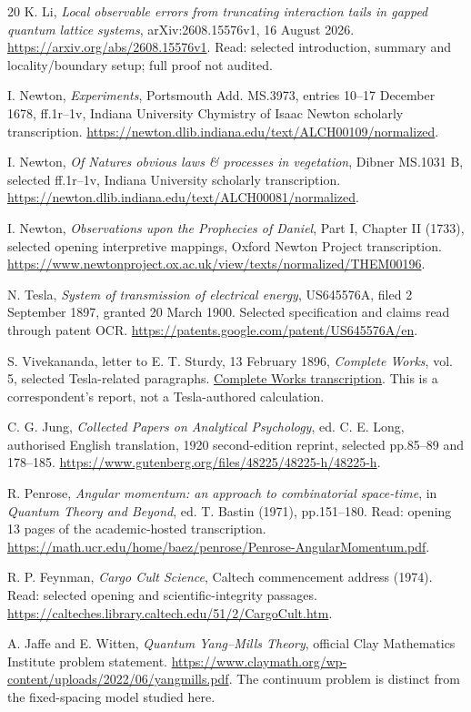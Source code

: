 \begin{thebibliography}{20}
K. Li,
\emph{Local observable errors from truncating interaction tails in gapped quantum lattice systems},
arXiv:2608.15576v1, 16 August 2026.
\url{https://arxiv.org/abs/2608.15576v1}.
Read: selected introduction, summary and locality/boundary setup; full proof not audited.

I. Newton, \emph{Experiments}, Portsmouth Add. MS.3973,
entries 10--17 December 1678, ff.1r--1v,
Indiana University Chymistry of Isaac Newton scholarly transcription.
\url{https://newton.dlib.indiana.edu/text/ALCH00109/normalized}.

I. Newton, \emph{Of Natures obvious laws \& processes in vegetation},
Dibner MS.1031 B, selected ff.1r--1v,
Indiana University scholarly transcription.
\url{https://newton.dlib.indiana.edu/text/ALCH00081/normalized}.

I. Newton, \emph{Observations upon the Prophecies of Daniel},
Part I, Chapter II (1733), selected opening interpretive mappings,
Oxford Newton Project transcription.
\url{https://www.newtonproject.ox.ac.uk/view/texts/normalized/THEM00196}.

N. Tesla, \emph{System of transmission of electrical energy},
US645576A, filed 2 September 1897, granted 20 March 1900.
Selected specification and claims read through patent OCR.
\url{https://patents.google.com/patent/US645576A/en}.

S. Vivekananda, letter to E. T. Sturdy, 13 February 1896,
\emph{Complete Works}, vol. 5, selected Tesla-related paragraphs.
\href{https://www.ramakrishnavivekananda.info/vivekananda/volume_5/epistles_first_series/057_blessed_and_beloved.htm}{Complete Works transcription}.
This is a correspondent's report, not a Tesla-authored calculation.

C. G. Jung, \emph{Collected Papers on Analytical Psychology},
ed. C. E. Long, authorised English translation, 1920 second-edition reprint,
selected pp.85--89 and 178--185.
\url{https://www.gutenberg.org/files/48225/48225-h/48225-h}.

R. Penrose, \emph{Angular momentum: an approach to combinatorial space-time},
in \emph{Quantum Theory and Beyond}, ed. T. Bastin (1971), pp.151--180.
Read: opening 13 pages of the academic-hosted transcription.
\url{https://math.ucr.edu/home/baez/penrose/Penrose-AngularMomentum.pdf}.

R. P. Feynman, \emph{Cargo Cult Science}, Caltech commencement address (1974).
Read: selected opening and scientific-integrity passages.
\url{https://calteches.library.caltech.edu/51/2/CargoCult.htm}.

A. Jaffe and E. Witten, \emph{Quantum Yang--Mills Theory},
official Clay Mathematics Institute problem statement.
\url{https://www.claymath.org/wp-content/uploads/2022/06/yangmills.pdf}.
The continuum problem is distinct from the fixed-spacing model studied here.
\end{thebibliography}

